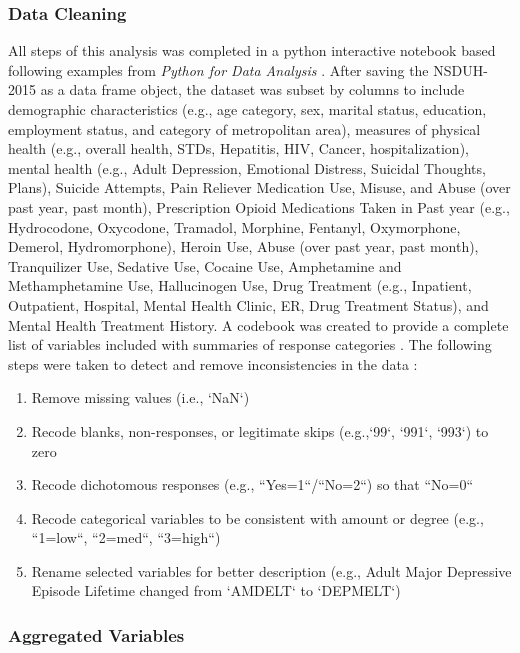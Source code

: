 \documentclass[sigconf]{acmart}
\begin{document}
\subsubsection{Data Cleaning}
All steps of this analysis was completed in a python interactive notebook 
\cite{data17} based following examples from \emph{Python for Data Analysis}
\cite{mckinney17}. After saving the NSDUH-2015 as a data frame object, the 
dataset was subset by columns to include demographic characteristics (e.g., 
age category, sex, marital status, education, employment status, and category 
of metropolitan area), measures of physical health (e.g., overall health, 
STDs, Hepatitis, HIV, Cancer, hospitalization), mental health (e.g., Adult 
Depression, Emotional Distress, Suicidal Thoughts, Plans), Suicide Attempts, 
Pain Reliever Medication Use, Misuse, and Abuse (over past year, past month), 
Prescription Opioid Medications Taken in Past year (e.g., Hydrocodone, 
Oxycodone, Tramadol, Morphine, Fentanyl, Oxymorphone, Demerol, Hydromorphone), 
Heroin Use, Abuse (over past year, past month), Tranquilizer Use, Sedative Use, 
Cocaine Use, Amphetamine and Methamphetamine Use, Hallucinogen Use, Drug 
Treatment (e.g., Inpatient, Outpatient, Hospital, Mental Health Clinic, ER, 
Drug Treatment Status), and Mental Health Treatment History. A codebook was 
created to provide a complete list of variables included with summaries 
of response categories \cite{codebook17}. The following steps were taken 
to detect and remove inconsistencies in the data \cite{rahm00}:
\begin{enumerate}
  \item Remove missing values (i.e., `NaN`) 
  \item Recode blanks, non-responses, or legitimate skips (e.g.,`99`, `991`, 
  `993`) to zero  
  \item Recode dichotomous responses (e.g., ``Yes=1``/``No=2``) so that ``No=0``
  \item Recode categorical variables to be consistent with amount or degree 
  (e.g., ``1=low``, ``2=med``, ``3=high``)
   \item Rename selected variables for better description (e.g., 
   Adult Major Depressive Episode Lifetime changed from `AMDELT` to `DEPMELT`)
\end{enumerate}

\subsubsection{Aggregated Variables}
\end{document}
